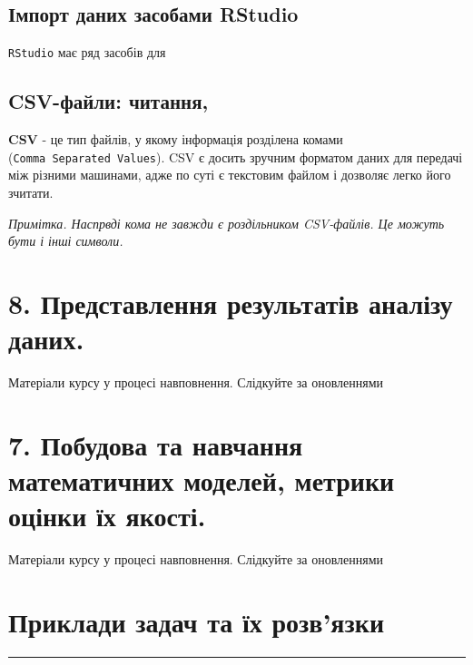 \documentclass[
]{book}
\begin{document}
\hypertarget{chapter321}{%
\section{Імпорт даних засобами RStudio}\label{chapter321}}

\texttt{RStudio} має ряд засобів для

\hypertarget{chapter321}{%
\section{CSV-файли: читання,}\label{chapter321}}

\textbf{CSV} - це тип файлів, у якому інформація розділена комами (\texttt{Comma\ Separated\ Values}). CSV є досить зручним форматом даних для передачі між різними машинами, адже по суті є текстовим файлом і дозволяє легко його зчитати.

\emph{Примітка. Наспрвді кома не завжди є роздільником CSV-файлів. Це можуть бути і інші символи.}

\hypertarget{chapter8}{%
\chapter{8. Представлення результатів аналізу даних.}\label{chapter8}}

Матеріали курсу у процесі навповнення. Слідкуйте за оновленнями

\hypertarget{chapter7}{%
\chapter{7. Побудова та навчання математичних моделей, метрики оцінки їх якості.}\label{chapter7}}

Матеріали курсу у процесі навповнення. Слідкуйте за оновленнями

\hypertarget{chapter6}{%
\chapter{Приклади задач та їх розв'язки}\label{chapter6}}

\begin{center}\rule{0.5\linewidth}{0.5pt}\end{center}
\end{document}
